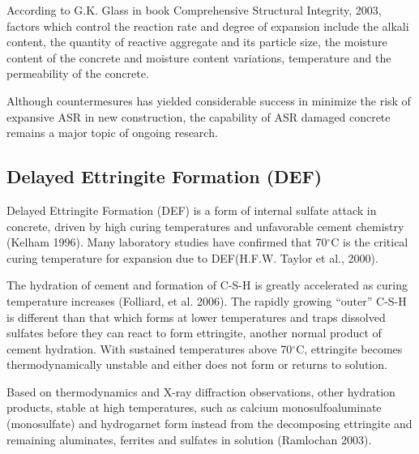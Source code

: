According to G.K. Glass\cite{Glass} in book Comprehensive Structural Integrity, 2003, factors which control the reaction rate and degree of expansion include the alkali content, the quantity of reactive aggregate and its particle size, the moisture content of the concrete and moisture content variations, temperature and the permeability of the concrete.


Although countermesures has yielded considerable success in minimize the risk of expansive ASR in new construction, the capability of ASR damaged concrete remains a major topic of ongoing research.

\subsection{Delayed Ettringite Formation (DEF)}

Delayed Ettringite Formation (DEF) is a form of internal sulfate attack in concrete, driven by high curing temperatures and unfavorable cement chemistry (Kelham 1996\cite{Kelham}). Many laboratory studies have confirmed that 70$^\circ$C is the critical curing temperature for expansion due to DEF(H.F.W. Taylor et al., 2000\cite{Taylor}).



The hydration of cement and formation of C-S-H is greatly accelerated as curing temperature increases (Folliard, et al. 2006\cite{Folliard}). The rapidly growing “outer” C-S-H is different than that which forms at lower temperatures and traps dissolved sulfates before they can react to form ettringite, another normal product of cement hydration. With sustained temperatures above 70$^\circ$C, ettringite becomes thermodynamically unstable and either does not form or returns to solution.


 Based on thermodynamics and X-ray diffraction observations, other hydration products, stable at high temperatures, such as calcium monosulfoaluminate (monosulfate) and hydrogarnet form instead from the decomposing ettringite and remaining aluminates, ferrites and sulfates in solution (Ramlochan 2003\cite{Ramlochan}).

